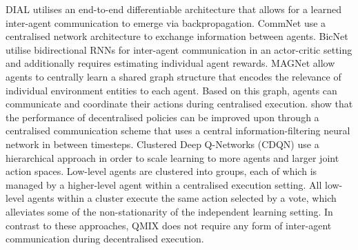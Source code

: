 \documentclass[twoside,11pt]{article}
\renewcommand{\cite}{\citep}
\begin{document}
DIAL
\cite{foerster_learning_2016} utilises an end-to-end differentiable architecture that allows for a learned inter-agent communication to emerge via backpropagation.
CommNet 
\cite{sukhbaatar_learning_2016} use a centralised network architecture to exchange information between agents. 
BicNet 
\cite{peng_multiagent_2017} utilise bidirectional RNNs for inter-agent communication in an actor-critic setting and  
additionally requires estimating individual agent rewards.
MAGNet \citep{malysheva_deep_2018} allow agents to centrally learn a shared graph structure that encodes the relevance of individual environment entities to each agent. Based on this graph, agents can communicate and coordinate their actions during centralised execution.
\citet{zhao_learning_2019} show that the performance of decentralised policies can be improved upon through a centralised communication scheme that uses a central information-filtering neural network in between timesteps.
Clustered Deep Q-Networks (CDQN) \citep{pageaud_multiagent_2019} use a hierarchical approach in order to scale learning to more agents and larger joint action spaces. Low-level agents are clustered into groups, each of which is managed by a higher-level agent within a centralised execution setting. All low-level agents within a cluster execute the same action selected by a vote, which alleviates some of the non-stationarity of the independent learning setting.
In contrast to these approaches, QMIX does not require any form of inter-agent communication during decentralised execution.
\end{document}
